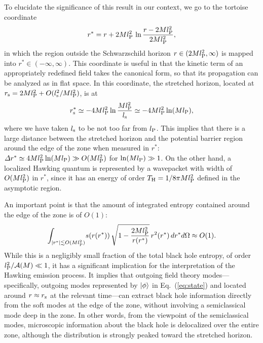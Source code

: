 \documentclass[12pt]{article}
\begin{document}
To elucidate the significance of this result in our context, we go 
to the tortoise coordinate
%
\begin{equation}
  r^* = r + 2M l_{\rm P}^2\, 
    \ln\frac{r-2M l_{\rm P}^2}{2M l_{\rm P}^2},
\label{eq:tortoise}
\end{equation}
%
in which the region outside the Schwarzschild horizon $r \in 
(2M l_{\rm P}^2, \infty)$ is mapped into $r^* \in (-\infty,\infty)$. 
This coordinate is useful in that the kinetic term of an appropriately 
redefined field takes the canonical form, so that its propagation can 
be analyzed as in flat space.  In this coordinate, the stretched 
horizon, located at $r_{\rm s} = 2M l_{\rm P}^2 + O(l_{\rm s}^2/M 
l_{\rm P}^2)$, is at
%
\begin{equation}
  r^*_{\rm s} \simeq -4M l_{\rm P}^2 
    \ln\frac{M l_{\rm P}^2}{l_{\rm s}} 
  \simeq -4M l_{\rm P}^2 \ln(M l_{\rm P}),
\label{eq:rs_stretched}
\end{equation}
%
where we have taken $l_{\rm s}$ to be not too far from $l_{\rm P}$. 
This implies that there is a large distance between the stretched 
horizon and the potential barrier region around the edge of the 
zone when measured in $r^*$:\ $\varDelta r^* \simeq 4M l_{\rm P}^2 
\ln(M l_{\rm P}) \gg O(M l_{\rm P}^2)$ for $\ln(M l_{\rm P}) \gg 1$. 
On the other hand, a localized Hawking quantum is represented by a 
wavepacket with width of $O(M l_{\rm P}^2)$ in $r^*$, since it has 
an energy of order $T_{\rm H} = 1/8\pi M l_{\rm P}^2$ defined in 
the asymptotic region.

An important point is that the amount of integrated entropy 
contained around the edge of the zone is of $O(1)$:
%
\begin{equation}
  \int_{|r^*| \lesssim O(M l_{\rm P}^2)}\! s(r(r^*))\, 
    \sqrt{1-\frac{2M l_{\rm P}^2}{r(r^*)}}\, r^2(r^*)\, dr^* d\Omega
  \approx O(1).
\label{eq:entropy}
\end{equation}
%
While this is a negligibly small fraction of the total black 
hole entropy, of order $l_{\rm P}^2/{\cal A}(M) \ll 1$, it 
has a significant implication for the interpretation of the 
Hawking emission process.  It implies that outgoing field theory 
modes---specifically, outgoing modes represented by $| \phi \rangle$ 
in Eq.~(\ref{eq:state}) and located around $r \approx r_{\rm z}$ 
at the relevant time---can extract black hole information directly 
from the soft modes at the edge of the zone, without involving 
a semiclassical mode deep in the zone.  In other words, from the 
viewpoint of the semiclassical modes, microscopic information 
about the black hole is delocalized over the entire zone, although 
the distribution is strongly peaked toward the stretched horizon.
\end{document}
